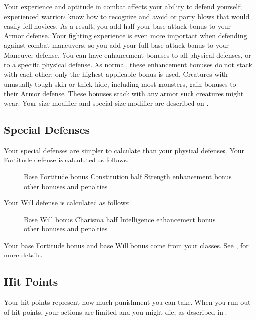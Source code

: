  Your experience and aptitude in combat affects your ability to defend yourself; experienced warriors know how to recognize and avoid or parry blows that would easily fell novices. As a result, you add half your base attack bonus to your Armor defense. Your fighting experience is even more important when defending against combat maneuvers, so you add your full base attack bonus to your Maneuver defense.
 You can have enhancement bonuses to all physical defenses, or to a specific physical defense. As normal, these enhancement bonuses do not stack with each other; only the highest applicable bonus is used.
 Creatures with unusually tough skin or thick hide, including most monsters, gain bonuses to their Armor defense. These bonuses stack with any armor such creatures might wear.
 Your size modifier and special size modifier are described on .

\subsection{Special Defenses}

Your special defenses are simpler to calculate than your physical defenses. Your Fortitude defense is calculated as follows:

\begin{figure}[h]
\centering Base Fortitude bonus \add Constitution \add half Strength \add enhancement bonus \add other bonuses and penalties
\end{figure}

Your Will defense is calculated as follows:

\begin{figure}[h]
\centering Base Will bonus \add Charisma \add half Intelligence \add enhancement bonus \add other bonuses and penalties
\end{figure}
 Your base Fortitude bonus and base Will bonus come from your classes. See , for more details.

\subsection{Hit Points}
Your hit points represent how much punishment you can take. When you run out of hit points, your actions are limited and you might die, as described in .

